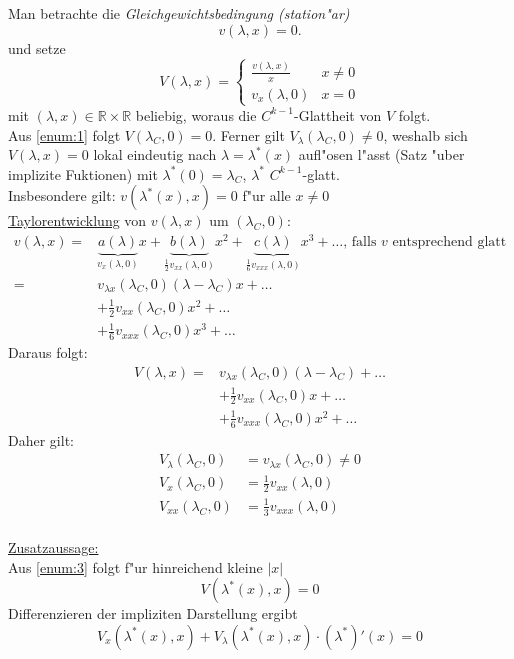 \documentclass[a4paper, 13pt]{scrreprt}
\theoremstyle{definition} \newtheorem{definition}{Definition}[section]
\newenvironment{beweis}[1][Beweis]{\begin{trivlist}
\item[\hskip \labelsep {\bfseries #1}]}{\end{trivlist}}
\newcommand{\RR}{\mathbb{R}}
\begin{document}
\begin{beweis}
Man betrachte die \emph{Gleichgewichtsbedingung (station"ar)}
\[
v(\lambda,x) = 0.
\]
und setze 
\[
V(\lambda,x) =
\begin{cases}
\frac{v(\lambda,x)}{x} & x\neq 0\\
v_x(\lambda,0) & x = 0
\end{cases}
\]
mit $(\lambda,x)\in\RR\times\RR$ beliebig, woraus die $C^{k-1}$-Glattheit von $V$ folgt.
\\
Aus \ref{enum:1} folgt $V(\lambda_C,0) = 0$. Ferner gilt $V_\lambda(\lambda_C,0)\neq 0$, weshalb sich $V(\lambda,x) = 0$ lokal eindeutig nach  $\lambda = \lambda^*(x)$ aufl"osen l"asst (Satz "uber implizite Fuktionen) mit $\lambda^*(0) = \lambda_C$, $\lambda^*$ $C^{k-1}$-glatt.
\\
Insbesondere gilt: $v(\lambda^*(x),x) = 0$ f"ur alle $x\neq 0$
\\
\underline{Taylorentwicklung} von $v(\lambda,x)$ um $(\lambda_C,0)$:
\begin{align*}
v(\lambda,x)=&\underbrace{a(\lambda)}_{v_x(\lambda,0)}x + \underbrace{b(\lambda)}_{\frac{1}{2}v_{xx}(\lambda,0)}x^2 + \underbrace{c(\lambda)}_{\frac{1}{6}v_{xxx}(\lambda,0)}x^3 + \dots\text{, falls } v \text{ entsprechend glatt}\\
=& v_{\lambda x}(\lambda_C,0)(\lambda-\lambda_C)x +\dots\\
&+ \frac{1}{2}v_{xx}(\lambda_C,0)x^2 + \dots\\
&+ \frac{1}{6}v_{xxx}(\lambda_C,0)x^3 + \dots
\end{align*}
Daraus folgt:
\begin{align*}
V(\lambda,x) =&  v_{\lambda x}(\lambda_C,0)(\lambda - \lambda_C) + \dots \\
&+ \frac{1}{2}v_{xx}(\lambda_C,0)x + \dots\\
&+\frac{1}{6}v_{xxx}(\lambda_C,0)x^2 + \dots
\end{align*}
Daher gilt:
\begin{align*}
V_\lambda(\lambda_C,0) &= v_{\lambda x}(\lambda_C,0)\neq 0\\
V_x(\lambda_C,0) &= \frac{1}{2}v_{xx}(\lambda,0)\\
V_{xx}(\lambda_C,0) &= \frac{1}{3}v_{xxx}(\lambda,0)
\end{align*}
\\\underline{Zusatzaussage:}
\\Aus \ref{enum:3} folgt f"ur hinreichend kleine $|x|$
$$ V(\lambda^*(x),x) = 0 $$
Differenzieren der impliziten Darstellung ergibt 
$$V_x(\lambda^*(x),x) + V_\lambda(\lambda^*(x),x)\cdot(\lambda^*)'(x) = 0$$

\end{beweis}
\end{document}
